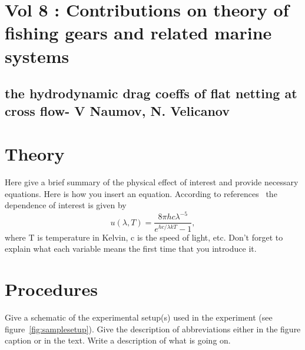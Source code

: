 \documentclass[letterpaper,12pt]{article}
\begin{document}
\section{Vol 8 : Contributions on theory of fishing gears and related marine systems}
\subsection{the hydrodynamic drag coeffs of flat netting at cross flow- V Naumov, N. Velicanov}







\section{Theory}

Here give a brief summary of the physical effect of interest and provide
necessary equations. Here is how you insert an equation. According to
references~\cite{melissinos, Cyr, Wiki} the dependence of interest is given
by
\begin{equation} \label{eq:aperp} %
u(\lambda,T)=\frac{8\pi hc\lambda^{-5}}{e^{hc/\lambda kT}-1},
\end{equation}
where T is temperature in Kelvin, c is the speed of light, etc. Don't forget to
explain what each variable means the first time that you introduce it.


\section{Procedures}

Give a schematic of the experimental setup(s) used in the experiment (see
figure~\ref{fig:samplesetup}). Give the description of  abbreviations
either in the figure caption or in the text. Write a description of what is
going on. 
\end{document}
